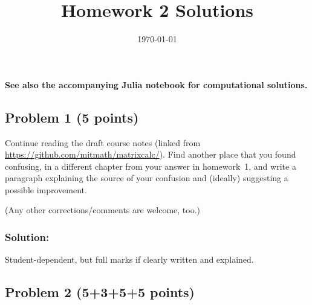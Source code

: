 \documentclass[10pt,oneside]{article}
\author{}
\title{Homework 2 Solutions}
\date{\today}
\begin{document}
%
%

\maketitle
\thispagestyle{fancy} 

{\bf See also the accompanying Julia notebook for computational solutions.  }

\subsection*{Problem 1 (5 points)}

Continue reading the draft course notes (linked from \url{https://github.com/mitmath/matrixcalc/}).   Find another place that you found confusing, in a different chapter from your answer in homework~1, and write a paragraph explaining the source of your confusion and (ideally) suggesting a possible improvement.

(Any other corrections/comments are welcome, too.)

\subsubsection*{Solution:}

Student-dependent, but full marks if clearly written and explained.

\subsection*{Problem 2 (5+3+5+5 points)}
\end{document}
